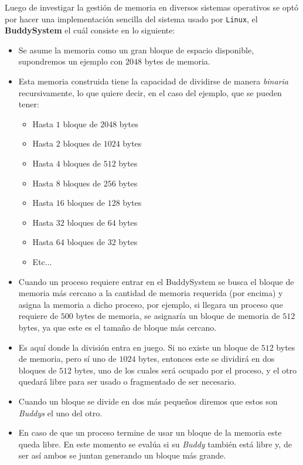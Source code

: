 Luego de investigar la gestión de memoria en diversos sistemas operativos se optó por hacer una implementación sencilla del sistema usado por \texttt{Linux}, el \textbf{BuddySystem} el cuál consiste en lo siguiente:
\begin{itemize}
    \item Se asume la memoria como un gran bloque de espacio disponible, supondremos un ejemplo con $2048$ bytes de memoria.
    \item Esta memoria construida tiene la capacidad de dividirse de manera \textit{binaria} recursivamente, lo que quiere decir, en el caso del ejemplo, que se pueden tener:
    \begin{itemize}
        \item Hasta $1$ bloque de $2048$ bytes
        \item Hasta $2$ bloques de $1024$ bytes
        \item Hasta $4$ bloques de $512$ bytes
        \item Hasta $8$ bloques de $256$ bytes
        \item Hasta $16$ bloques de $128$ bytes
        \item Hasta $32$ bloques de $64$ bytes
        \item Hasta $64$ bloques de $32$ bytes
        \item Etc$\dots$
    \end{itemize}
    \item Cuando un proceso requiere entrar en el BuddySystem se busca el bloque de memoria más cercano a la cantidad de memoria requerida (por encima) y asigna la memoria a dicho proceso, por ejemplo, si llegara un proceso que requiere de $500$ bytes de memoria, se asignaría un bloque de memoria de $512$ bytes, ya que este es el tamaño de bloque más cercano.
    \item Es aquí donde la división entra en juego. Si no existe un bloque de $512$ bytes de memoria, pero sí uno de $1024$ bytes, entonces este se dividirá en dos bloques de $512$ bytes, uno de los cuales será ocupado por el proceso, y el otro quedará libre para ser usado o fragmentado de ser necesario.
    \item Cuando un bloque se divide en dos más pequeños diremos que estos son \textit{Buddys} el uno del otro.
    \item En caso de que un proceso termine de usar un bloque de la memoria este queda libre. En este momento se evalúa si su \textit{Buddy} también está libre y, de ser así ambos se juntan generando un bloque más grande.
\end{itemize}


